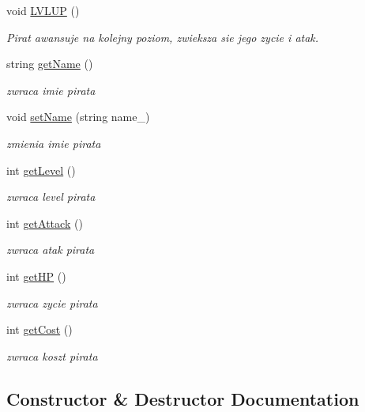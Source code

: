 \begin{DoxyCompactItemize}
\item 
void \hyperlink{class_crew_member_a704d4e951b7b794e1f2acc4072fd4234}{L\+V\+L\+UP} ()
\begin{DoxyCompactList}\small\item\em Pirat awansuje na kolejny poziom, zwieksza sie jego zycie i atak. \end{DoxyCompactList}\item 
string \hyperlink{class_crew_member_a730e140e62942ff6e0ecaf13a5659479}{get\+Name} ()
\begin{DoxyCompactList}\small\item\em zwraca imie pirata \end{DoxyCompactList}\item 
void \hyperlink{class_crew_member_ac2558ae043b9252881a2cbff11b9d27a}{set\+Name} (string name\+\_\+)
\begin{DoxyCompactList}\small\item\em zmienia imie pirata \end{DoxyCompactList}\item 
int \hyperlink{class_crew_member_ad2690b5ea050ff33c969b4b8c18d88b3}{get\+Level} ()
\begin{DoxyCompactList}\small\item\em zwraca level pirata \end{DoxyCompactList}\item 
int \hyperlink{class_crew_member_aa3af9da6005c0cde36e91ebac14ff833}{get\+Attack} ()
\begin{DoxyCompactList}\small\item\em zwraca atak pirata \end{DoxyCompactList}\item 
int \hyperlink{class_crew_member_aae0cd068de1105bf494869b3ad1c7bbd}{get\+HP} ()
\begin{DoxyCompactList}\small\item\em zwraca zycie pirata \end{DoxyCompactList}\item 
int \hyperlink{class_crew_member_a72be72a3277cb26d86e67687c46e3b3f}{get\+Cost} ()
\begin{DoxyCompactList}\small\item\em zwraca koszt pirata \end{DoxyCompactList}\end{DoxyCompactItemize}


\subsection{Constructor \& Destructor Documentation}
\mbox{\label{class_crew_member_aa37f9cc1bc79a2661fa6cc61b148fb87}} 
